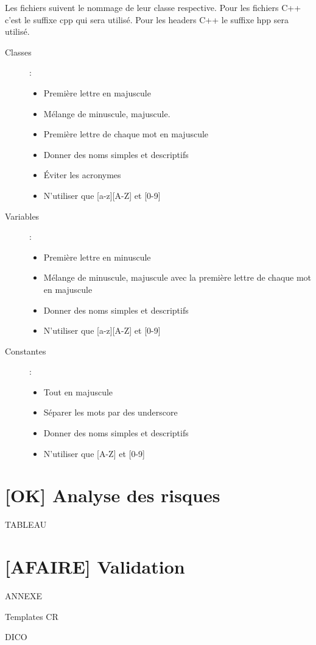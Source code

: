 \documentclass[10pt,a4paper]{article}
\begin{document}
Les fichiers suivent le nommage de leur classe respective.
Pour les fichiers C++ c'est le suffixe cpp qui sera utilisé. Pour les headers C++ le suffixe hpp sera utilisé.
\begin{description}
\item [Classes] :
\begin{itemize}
\item Première lettre en majuscule 
\item Mélange de minuscule, majuscule. 
\item Première lettre de chaque mot en majuscule
\item Donner des noms simples et descriptifs 
\item Éviter les acronymes 
\item N’utiliser que [a-z][A-Z] et [0-9]
\end{itemize}

\item [Variables] : 
\begin{itemize}
\item Première lettre en minuscule
\item Mélange de minuscule, majuscule avec la première lettre de chaque mot en majuscule 
\item Donner des noms simples et descriptifs 
\item N’utiliser que [a-z][A-Z] et [0-9] 
\end{itemize}


\item [Constantes] :
\begin{itemize}
\item Tout en majuscule 
\item Séparer les mots par des underscore
\item Donner des noms simples et descriptifs 
\item N’utiliser que [A-Z] et [0-9] 
\end{itemize}

\end{description}



\section{[OK] Analyse des risques}
TABLEAU  %



\section{[AFAIRE] Validation}


\newpage
\listoffigures
\newpage

\begin{appendix}

ANNEXE 

Templates CR

DICO

\end{appendix}
\end{document}
